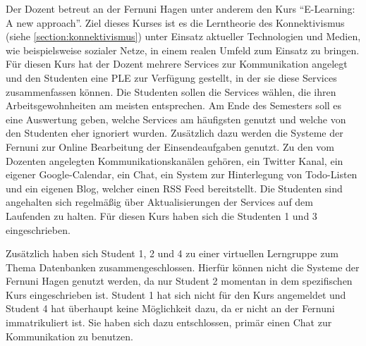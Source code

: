 Der Dozent betreut an der Fernuni Hagen unter anderem den Kurs "`E-Learning: A new approach"'. Ziel dieses Kurses ist es die Lerntheorie des Konnektivismus (siehe \ref{section:konnektivismus}) unter Einsatz aktueller Technologien und Medien, wie beispielsweise sozialer Netze, in einem realen Umfeld zum Einsatz zu bringen.  Für diesen Kurs hat der Dozent mehrere Services zur Kommunikation angelegt und den Studenten eine \ac{PLE} zur Verfügung gestellt, in der sie diese Services zusammenfassen können. Die Studenten sollen die Services wählen, die ihren Arbeitsgewohnheiten am meisten entsprechen. Am Ende des Semesters soll es eine Auswertung geben, welche Services am häufigsten genutzt und welche von den Studenten eher ignoriert wurden. Zusätzlich dazu werden die Systeme der Fernuni zur Online Bearbeitung der Einsendeaufgaben genutzt. Zu den vom Dozenten angelegten Kommunikationskanälen gehören, ein Twitter Kanal, ein eigener Google-Calendar, ein Chat, ein System zur Hinterlegung von Todo-Listen und ein eigenen Blog, welcher einen \ac{RSS} Feed bereitstellt. Die Studenten sind angehalten sich regelmäßig über Aktualisierungen der Services auf dem Laufenden zu halten. Für diesen Kurs haben sich die Studenten 1 und 3 eingeschrieben.

Zusätzlich haben sich Student 1, 2 und 4 zu einer virtuellen Lerngruppe zum Thema Datenbanken zusammengeschlossen. Hierfür können nicht die Systeme der Fernuni Hagen genutzt werden, da nur Student 2 momentan in dem spezifischen Kurs eingeschrieben ist. Student 1 hat sich nicht für den Kurs angemeldet und Student 4 hat überhaupt keine Möglichkeit dazu, da er nicht an der Fernuni immatrikuliert ist. Sie haben sich dazu entschlossen, primär einen Chat zur Kommunikation zu benutzen.

